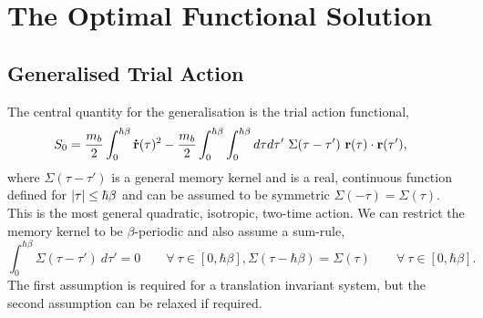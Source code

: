 

\section{The Optimal Functional Solution}
\label{sec:chap-fourth-second}

\subsection{Generalised Trial Action}

The central quantity for the generalisation is the trial action functional,
\begin{equation} \label{eqn:generaltrial}
    \begin{aligned}
        S_0 &= \frac{m_b}{2} \int_0^{\hbar\beta} \vb{\Dot{r}}(\tau)^2 - \frac{m_b}{2} \int_0^{\hbar\beta} \int_0^{\hbar\beta} d\tau d\tau'\ \Sigma(\tau - \tau')\ \vb{r}(\tau) \cdot \vb{r}(\tau'),
    \end{aligned}
\end{equation}
where $\Sigma(\tau - \tau')$ is a general memory kernel and is a real, continuous function defined for $\abs{\tau} \leq \hbar\beta$ and can be assumed to be symmetric $\Sigma(-\tau) = \Sigma(\tau)$. This is the most general quadratic, isotropic, two-time action. We can restrict the memory kernel to be $\beta$-periodic and also assume a sum-rule,
\begin{subequations}
    \begin{equation}
        \int_0^{\hbar\beta} \Sigma(\tau - \tau')\ d\tau' = 0 \qquad \forall\ \tau \in [0, \hbar\beta],
    \end{equation}
    \begin{equation}
        \Sigma(\tau - \hbar\beta) = \Sigma(\tau) \qquad \forall\ \tau \in [0, \hbar\beta].
    \end{equation}
\end{subequations}
The first assumption is required for a translation invariant system, but the second assumption can be relaxed if required. 

